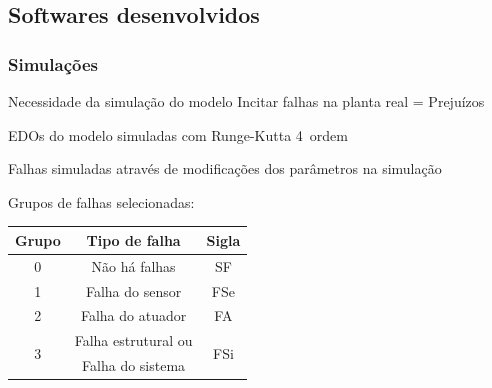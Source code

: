 \documentclass{beamer}
\begin{document}
\subsection{Softwares desenvolvidos}
\begin{frame}
    \frametitle{Simulações}

    Necessidade da simulação do modelo \implica Incitar falhas na planta real =
    Prejuízos

    \vspace{0.25cm}

    EDOs do modelo simuladas com Runge-Kutta 4\textordfeminine\ ordem

    \vspace{0.25cm}

    Falhas simuladas através de modificações dos parâmetros na simulação

    \vspace{0.25cm}

    Grupos de falhas selecionadas:

\begin{table}[!htb]
\small
\centering
\begin{tabular}{|c|c|c|}
\hline
{\bf Grupo} & {\bf Tipo de falha} & {\bf Sigla}\\
\hline
\hline
0 & Não há falhas & SF\\
\hline
1 & Falha do sensor & FSe\\
\hline
2 & Falha do atuador & FA\\
\hline
\multirow{2}{*}{3} & 
Falha estrutural ou & 
\multirow{2}{*}{FSi}\\
&
Falha do sistema & 
\\
\hline
\end{tabular}
\end{table}
\end{frame}
\end{document}
